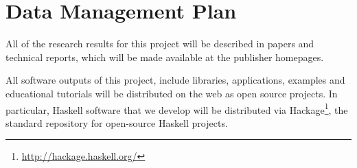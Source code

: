 \section{Data Management Plan}

All of the research results for this project will be described in
papers and technical reports, which will be made available at
the publisher homepages.

All software outputs of this project, include libraries, applications,
examples and educational tutorials will be distributed on the web as
open source projects. In particular, Haskell software that we develop
will be distributed via
Hackage\footnote{\url{http://hackage.haskell.org/}}, the standard
repository for open-source Haskell projects.
